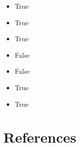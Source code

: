 \documentclass[
  nswissgerman,
  a4paper,
  openany]{book}
\providecommand{\tightlist}{%
  \setlength{\itemsep}{0pt}\setlength{\parskip}{0pt}}
\begin{document}
\begin{itemize}
\tightlist
\item
  True
\item
  True
\item
  True
\item
  False
\item
  False
\item
  True
\item
  True
\end{itemize}


\chapter*{References}\label{references}

\end{document}
